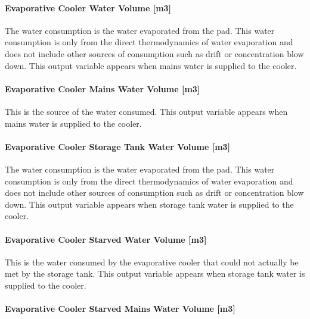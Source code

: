 \paragraph{Evaporative Cooler Water Volume {[}m3{]}}\label{evaporative-cooler-water-volume-m3}

The water consumption is the water evaporated from the pad. This water consumption is only from the direct thermodynamics of water evaporation and does not include other sources of consumption such as drift or concentration blow down. This output variable appears when mains water is supplied to the cooler.

\paragraph{Evaporative Cooler Mains Water Volume {[}m3{]}}\label{evaporative-cooler-mains-water-volume-m3}

This is the source of the water consumed. This output variable appears when mains water is supplied to the cooler.

\paragraph{Evaporative Cooler Storage Tank Water Volume {[}m3{]}}\label{evaporative-cooler-storage-tank-water-volume-m3}

The water consumption is the water evaporated from the pad. This water consumption is only from the direct thermodynamics of water evaporation and does not include other sources of consumption such as drift or concentration blow down. This output variable appears when storage tank water is supplied to the cooler.

\paragraph{Evaporative Cooler Starved Water Volume {[}m3{]}}\label{evaporative-cooler-starved-water-volume-m3}

This is the water consumed by the evaporative cooler that could not actually be met by the storage tank. This output variable appears when storage tank water is supplied to the cooler.

\paragraph{Evaporative Cooler Starved Mains Water Volume {[}m3{]}}\label{evaporative-cooler-starved-mains-water-volume-m3}

